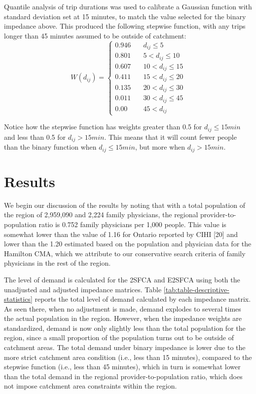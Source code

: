 \documentclass[10pt,letterpaper]{article}
\begin{document}
Quantile analysis of trip durations was used to calibrate a Gaussian
function with standard deviation set at 15 minutes, to match the value
selected for the binary impedance above. This produced the following
stepwise function, with any trips longer than 45 minutes assumed to be
outside of catchment: \[
W(d_{ij}) = \left\{
        \begin{array}{ll}
            0.946 & \quad d_{ij} \leq 5 \\
            0.801 & \quad 5 < d_{ij} \leq 10 \\
            0.607 & \quad 10 < d_{ij} \leq 15 \\
            0.411 & \quad 15 < d_{ij} \leq 20 \\
            0.135 & \quad 20 < d_{ij} \leq 30 \\
            0.011 & \quad 30 < d_{ij} \leq 45 \\
            0.00 & \quad 45 < d_{ij}
        \end{array}
    \right.
\]

Notice how the stepwise function has weights greater than 0.5 for
\(d_{ij} \leq 15 min\) and less than 0.5 for \(d_{ij} > 15 min\). This
means that it will count fewer people than the binary function when
\(d_{ij} \leq 15 min\), but more when \(d_{ij} > 15 min\).

\section{Results}\label{results}

We begin our discussion of the results by noting that with a total
population of the region of 2,959,090 and 2,224 family physicians, the
regional provider-to-population ratio is 0.752 family physicians per
1,000 people. This value is somewhat lower than the value of 1.16 for
Ontario reported by CIHI {[}20{]} and lower than the 1.20 estimated
based on the population and physician data for the Hamilton CMA, which
we attribute to our conservative search criteria of family physicians in
the rest of the region.

The level of demand is calculated for the 2SFCA and E2SFCA using both
the unadjusted and adjusted impedance matrices. Table
\ref{tab:table-descriptive-statistics} reports the total level of demand
calculated by each impedance matrix. As seen there, when no adjustment
is made, demand explodes to several times the actual population in the
region. However, when the impedance weights are standardized, demand is
now only slightly less than the total population for the region, since a
small proportion of the population turns out to be outside of catchment
areas. The total demand under binary impedance is lower due to the more
strict catchment area condition (i.e., less than 15 minutes), compared
to the stepwise function (i.e., less than 45 minutes), which in turn is
somewhat lower than the total demand in the regional
provider-to-population ratio, which does not impose catchment area
constraints within the region.
\end{document}
